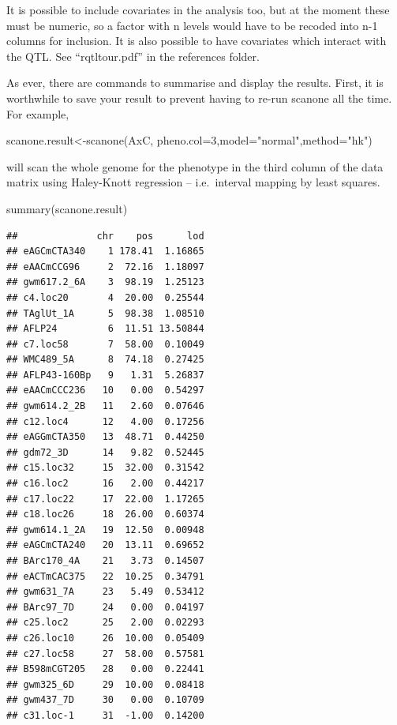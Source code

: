 \documentclass[
]{book}
\newenvironment{Shaded}{\begin{snugshade}}{\end{snugshade}}
\newcommand{\AttributeTok}[1]{\textcolor[rgb]{0.77,0.63,0.00}{#1}}
\newcommand{\DecValTok}[1]{\textcolor[rgb]{0.00,0.00,0.81}{#1}}
\newcommand{\FunctionTok}[1]{\textcolor[rgb]{0.00,0.00,0.00}{#1}}
\newcommand{\NormalTok}[1]{#1}
\newcommand{\OtherTok}[1]{\textcolor[rgb]{0.56,0.35,0.01}{#1}}
\newcommand{\StringTok}[1]{\textcolor[rgb]{0.31,0.60,0.02}{#1}}
\begin{document}
It is possible to include covariates in the analysis too, but at the moment these must be numeric, so a factor with n levels would have to be recoded into n-1 columns for inclusion. It is also possible to have covariates which interact with the QTL. See ``rqtltour.pdf'' in the references folder.

As ever, there are commands to summarise and display the results. First, it is worthwhile to save your result to prevent having to re-run scanone all the time. For example,

\begin{Shaded}
\begin{Highlighting}[]
\NormalTok{scanone.result}\OtherTok{\textless{}{-}}\FunctionTok{scanone}\NormalTok{(AxC, }\AttributeTok{pheno.col=}\DecValTok{3}\NormalTok{,}\AttributeTok{model=}\StringTok{"normal"}\NormalTok{,}\AttributeTok{method=}\StringTok{"hk"}\NormalTok{) }
\end{Highlighting}
\end{Shaded}

will scan the whole genome for the phenotype in the third column of the data matrix using Haley-Knott regression -- i.e.~interval mapping by least squares.

\begin{Shaded}
\begin{Highlighting}[]
\FunctionTok{summary}\NormalTok{(scanone.result) }
\end{Highlighting}
\end{Shaded}

\begin{verbatim}
##              chr    pos      lod
## eAGCmCTA340    1 178.41  1.16865
## eAACmCCG96     2  72.16  1.18097
## gwm617.2_6A    3  98.19  1.25123
## c4.loc20       4  20.00  0.25544
## TAglUt_1A      5  98.38  1.08510
## AFLP24         6  11.51 13.50844
## c7.loc58       7  58.00  0.10049
## WMC489_5A      8  74.18  0.27425
## AFLP43-160Bp   9   1.31  5.26837
## eAACmCCC236   10   0.00  0.54297
## gwm614.2_2B   11   2.60  0.07646
## c12.loc4      12   4.00  0.17256
## eAGGmCTA350   13  48.71  0.44250
## gdm72_3D      14   9.82  0.52445
## c15.loc32     15  32.00  0.31542
## c16.loc2      16   2.00  0.44217
## c17.loc22     17  22.00  1.17265
## c18.loc26     18  26.00  0.60374
## gwm614.1_2A   19  12.50  0.00948
## eAGCmCTA240   20  13.11  0.69652
## BArc170_4A    21   3.73  0.14507
## eACTmCAC375   22  10.25  0.34791
## gwm631_7A     23   5.49  0.53412
## BArc97_7D     24   0.00  0.04197
## c25.loc2      25   2.00  0.02293
## c26.loc10     26  10.00  0.05409
## c27.loc58     27  58.00  0.57581
## B598mCGT205   28   0.00  0.22441
## gwm325_6D     29  10.00  0.08418
## gwm437_7D     30   0.00  0.10709
## c31.loc-1     31  -1.00  0.14200
\end{verbatim}
\end{document}
